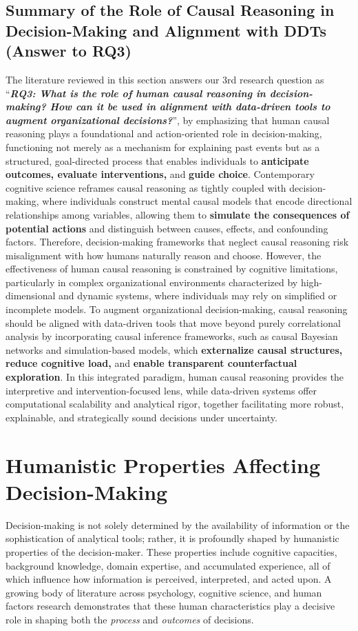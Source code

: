 \documentclass{sfuthesis}
\begin{document}
\subsection{Summary of the Role of Causal Reasoning in Decision-Making and Alignment with DDTs (Answer to RQ3)}
The literature reviewed in this section answers our 3rd research question as “\textit{\textbf{RQ3: What is the role of human causal reasoning in decision-making? How can it be used in alignment with data-driven tools to augment organizational decisions?}}”, by emphasizing that human causal reasoning plays a foundational and action-oriented role in decision-making, functioning not merely as a mechanism for explaining past events but as a structured, goal-directed process that enables individuals to \textbf{anticipate outcomes, evaluate interventions, }and\textbf{ guide choice}. Contemporary cognitive science reframes causal reasoning as tightly coupled with decision-making, where individuals construct mental causal models that encode directional relationships among variables, allowing them to \textbf{simulate the consequences of potential actions} and distinguish between causes, effects, and confounding factors. Therefore, decision-making frameworks that neglect causal reasoning risk misalignment with how humans naturally reason and choose. However, the effectiveness of human causal reasoning is constrained by cognitive limitations, particularly in complex organizational environments characterized by high-dimensional and dynamic systems, where individuals may rely on simplified or incomplete models. To augment organizational decision-making, causal reasoning should be aligned with data-driven tools that move beyond purely correlational analysis by incorporating causal inference frameworks, such as causal Bayesian networks and simulation-based models, which \textbf{externalize causal structures, reduce cognitive load, }and\textbf{ enable transparent counterfactual exploration}. In this integrated paradigm, human causal reasoning provides the interpretive and intervention-focused lens, while data-driven systems offer computational scalability and analytical rigor, together facilitating more robust, explainable, and strategically sound decisions under uncertainty.

\section{Humanistic Properties Affecting Decision-Making}
Decision-making is not solely determined by the availability of information or the sophistication of analytical tools; rather, it is profoundly shaped by humanistic properties of the decision-maker. These properties include cognitive capacities, background knowledge, domain expertise, and accumulated experience, all of which influence how information is perceived, interpreted, and acted upon. A growing body of literature across psychology, cognitive science, and human factors research demonstrates that these human characteristics play a decisive role in shaping both the \textit{process} and \textit{outcomes} of decisions.
\end{document}
